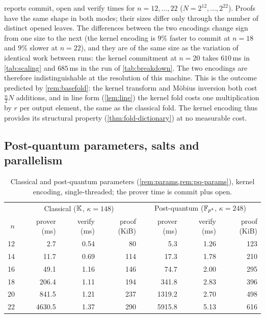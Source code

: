  reports commit, open and verify times for $n = 12,\dots,22$ ($N = 2^{12},\dots,2^{22}$).
Proofs have the same shape in both modes; their sizes differ only through the number of distinct opened leaves.
The differences between the two encodings change sign from one size to the next (the kernel encoding is $9\%$ faster to commit at $n = 18$ and $9\%$ slower at $n = 22$), and they are of the same size as the variation of identical work between runs: the kernel commitment at $n = 20$ takes $610$\,ms in \cref{tab:scaling} and $685$\,ms in the run of \cref{tab:breakdown}.
The two encodings are therefore indistinguishable at the resolution of this machine.
This is the outcome predicted by \cref{rem:basefold}: the kernel transform and M\"obius inversion both cost $\tfrac{n}{2}N$ additions, and in line form (\cref{lem:line}) the kernel fold costs one multiplication by $r$ per output element, the same as the classical fold.
The kernel encoding thus provides its structural property (\cref{thm:fold-dictionary}) at no measurable cost.

\subsection{Post-quantum parameters, salts and parallelism}\label{sec:exp:pq}

\begin{table}[t]
\centering
\small
\begin{tabular}{r rrr rrr}
\toprule
 & \multicolumn{3}{c}{Classical ($\mathbb{K}$, $\kappa = 148$)} & \multicolumn{3}{c}{Post-quantum ($\mathbb{F}_{p^4}$, $\kappa = 248$)} \\
$n$ & prover (ms) & verify (ms) & proof (KiB) & prover (ms) & verify (ms) & proof (KiB) \\
\midrule
12 & 2.7 & 0.54 & 80 & 5.3 & 1.26 & 123 \\
14 & 11.7 & 0.69 & 114 & 17.3 & 1.78 & 210 \\
16 & 49.1 & 1.16 & 146 & 74.7 & 2.00 & 295 \\
18 & 206.4 & 1.11 & 194 & 341.8 & 2.83 & 396 \\
20 & 841.5 & 1.21 & 237 & 1319.2 & 2.70 & 498 \\
22 & 4630.5 & 1.37 & 290 & 5915.8 & 5.13 & 616 \\
\bottomrule
\end{tabular}
\caption{Classical and post-quantum parameters (\cref{rem:params,rem:pq-params}), kernel encoding, single-threaded; the prover time is commit plus open.}
\label{tab:pq}
\end{table}

